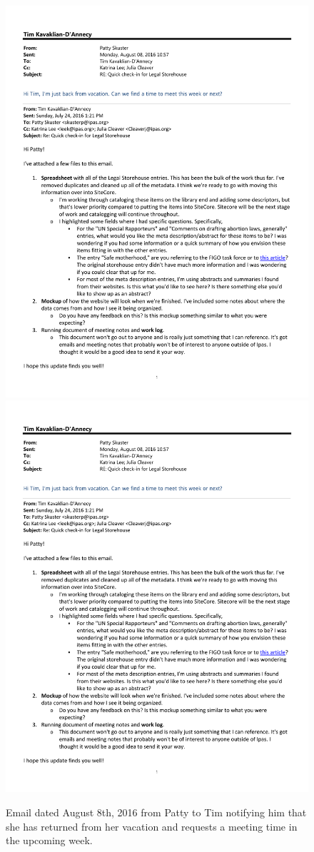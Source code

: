 \begin{figure}
  \centering
        \noindent\includegraphics[page=1,width=.45\textwidth]{documents/2016-08-08-Email-Patty-Tim} \hfill 
        \noindent\includegraphics[page=2,width=.45\textwidth]{documents/2016-08-08-Email-Patty-Tim} \hfill
 \caption{Email dated August 8th, 2016 from Patty to Tim notifying him that she has returned from her vacation and requests a meeting time in the upcoming week.}
 \label{fig:2016-08-08-Email-Patty-Tim}
\end{figure}

